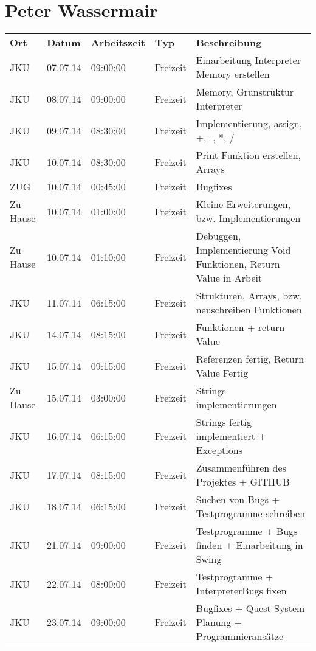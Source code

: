 \section{Peter Wassermair}

\begin{small}
\begin{longtable}{ p{} p{} p{} p{} p{}}
\textbf{Ort}	& \textbf{Datum}	& \textbf{Arbeitszeit}	& \textbf{Typ}	& \textbf{Beschreibung} \\
JKU	& 07.07.14	& 09:00:00	& Freizeit	& Einarbeitung Interpreter Memory erstellen \\
JKU	& 08.07.14	& 09:00:00	& Freizeit	& Memory, Grunstruktur Interpreter \\
JKU	& 09.07.14	& 08:30:00	& Freizeit	& Implementierung, assign, +, -, *, / \\
JKU	& 10.07.14	& 08:30:00	& Freizeit	& Print Funktion erstellen, Arrays \\
ZUG	& 10.07.14	& 00:45:00	& Freizeit	& Bugfixes \\
Zu Hause	& 10.07.14	& 01:00:00	& Freizeit	& Kleine Erweiterungen, bzw. Implementierungen \\
Zu Hause	& 10.07.14	& 01:10:00	& Freizeit	& Debuggen, Implementierung Void Funktionen, Return Value in Arbeit \\
JKU	& 11.07.14	& 06:15:00	& Freizeit	& Strukturen, Arrays, bzw. neuschreiben Funktionen \\
JKU	& 14.07.14	& 08:15:00	& Freizeit	& Funktionen + return Value \\
JKU	& 15.07.14	& 09:15:00	& Freizeit	& Referenzen fertig, Return Value Fertig \\
Zu Hause	& 15.07.14	& 03:00:00	& Freizeit	& Strings implementierungen \\
JKU	& 16.07.14	& 06:15:00	& Freizeit	& Strings fertig implementiert + Exceptions \\
JKU	& 17.07.14	& 08:15:00	& Freizeit	& Zusammenf\"uhren des Projektes + GITHUB \\
JKU	& 18.07.14	& 06:15:00	& Freizeit	& Suchen von Bugs + Testprogramme schreiben \\
JKU	& 21.07.14	& 09:00:00	& Freizeit	& Testprogramme + Bugs finden + Einarbeitung in Swing \\
JKU	& 22.07.14	& 08:00:00	& Freizeit	& Testprogramme + InterpreterBugs fixen \\
JKU	& 23.07.14	& 09:00:00	& Freizeit	& Bugfixes + Quest System Planung + Programmierans\"atze \\

\end{longtable}
\end{small}
